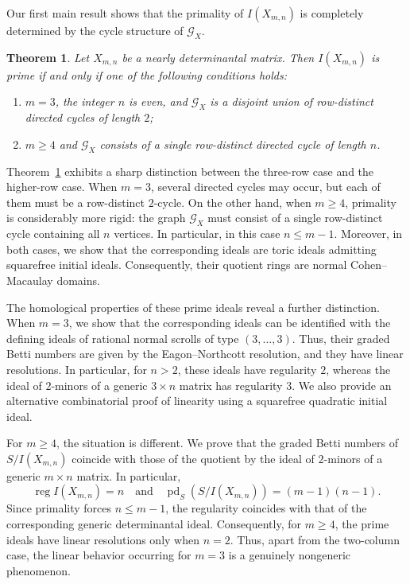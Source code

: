 \documentclass[12pt]{amsart}
\numberwithin{equation}{section}
\newtheorem{Theorem}{Theorem}[section]
\begin{document}
Our first main result shows that the primality of $I(X_{m,n})$ is
completely determined by the cycle structure of $\mathcal G_X$.

\begin{Theorem}\label{thm:prime-classification}
Let $X_{m,n}$ be a nearly determinantal matrix. Then
$I(X_{m,n})$ is prime if and only if one of the following conditions
holds:
\begin{enumerate}
     \item[{\em (i)}] $m=3$, the integer $n$ is even, and $\mathcal G_X$ is a
    disjoint union of row-distinct directed cycles of length $2$;
    \item[{\em (ii)}] $m\geq4$ and $\mathcal G_X$ consists of a single
    row-distinct directed cycle of length $n$.
\end{enumerate}
\end{Theorem}

Theorem~\ref{thm:prime-classification} exhibits a sharp
distinction between the three-row case and the higher-row
case. When $m=3$, several directed cycles may occur,
but each of them must be a row-distinct $2$-cycle.
On the other hand, when $m\geq4$, primality is
considerably more rigid: the graph $\mathcal G_X$
must consist of a single row-distinct cycle containing
all $n$ vertices. In particular, in this case
$n\leq m-1$. Moreover, in both cases, we show that
the corresponding ideals are toric ideals admitting
squarefree initial ideals. Consequently, their quotient
rings are normal Cohen--Macaulay domains.


The homological properties of these prime ideals reveal
a further distinction. When $m=3$, we show that the
corresponding ideals can be identified with the defining
ideals of rational normal scrolls of type $(3,\ldots,3)$.
Thus, their graded Betti numbers are given by the
Eagon--Northcott resolution, and they have linear
resolutions. In particular, for $n>2$, these ideals have
regularity $2$, whereas the ideal of $2$-minors of
a generic $3\times n$ matrix has regularity $3$. We also provide an alternative combinatorial
proof of linearity using a squarefree quadratic initial
ideal. 

For $m\geq 4$, the situation is different. We prove that
the graded Betti numbers of $S/I(X_{m,n})$ coincide with
those of the quotient by the ideal of $2$-minors of a
generic $m\times n$ matrix. In particular,
\[
\operatorname{reg} I(X_{m,n})=n
\quad\text{and}\quad
\operatorname{pd}_S(S/I(X_{m,n}))=(m-1)(n-1).
\]
Since primality forces $n\leq m-1$, the regularity
coincides with that of the corresponding generic
determinantal ideal. Consequently, for $m\geq 4$,
the prime ideals have linear resolutions only when
$n=2$. Thus, apart from the two-column case, the linear behavior occurring for $m=3$ is a genuinely nongeneric phenomenon.
\end{document}
